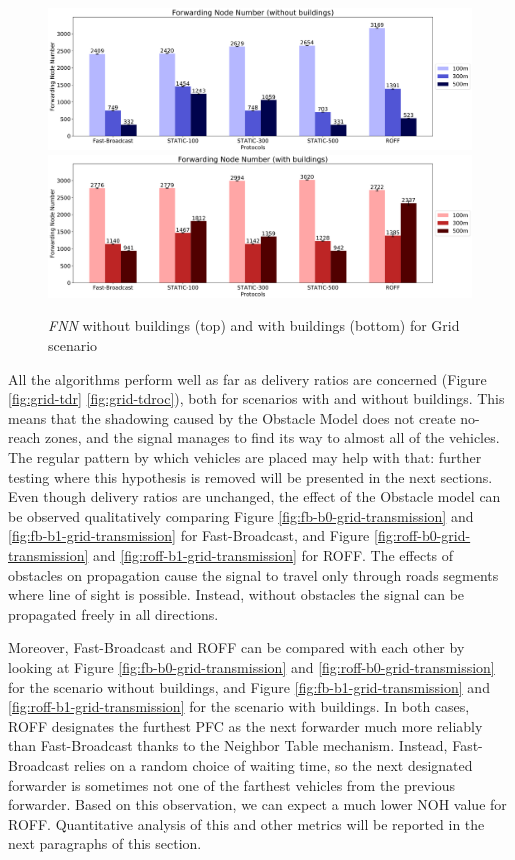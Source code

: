 		\begin{figure}[H]
			\centering
			\includegraphics[width=1.0\textwidth]{immagini/grid-300/b0/fnn}
			\includegraphics[width=1.0\textwidth]{immagini/grid-300/b1/fnn}
			\caption{\textit{FNN} without buildings (top) and with buildings (bottom) for Grid scenario}
			\label{fig:grid-fnn}
		\end{figure}
	
		All the algorithms perform well as far as delivery ratios are concerned (Figure \ref{fig:grid-tdr} \ref{fig:grid-tdroc}), both for scenarios with and without buildings. This means that the shadowing caused by the Obstacle Model does not create no-reach zones, and the signal manages to find its way to almost all of the vehicles. The regular pattern by which vehicles are placed may help with that: further testing where this hypothesis is removed will be presented in the next sections. Even though delivery ratios are unchanged, the effect of the Obstacle model can be observed qualitatively comparing Figure \ref{fig:fb-b0-grid-transmission} and \ref{fig:fb-b1-grid-transmission} for Fast-Broadcast, and Figure \ref{fig:roff-b0-grid-transmission} and \ref{fig:roff-b1-grid-transmission} for ROFF. The effects of obstacles on propagation cause the signal to travel only through roads segments where line of sight is possible. Instead, without obstacles the signal can be propagated freely in all directions.
		
		
		Moreover, Fast-Broadcast and ROFF can be compared with each other by looking at Figure \ref{fig:fb-b0-grid-transmission} and \ref{fig:roff-b0-grid-transmission} for the scenario without buildings, and Figure \ref{fig:fb-b1-grid-transmission} and \ref{fig:roff-b1-grid-transmission} for the scenario with buildings. In both cases, ROFF designates the furthest PFC as the next forwarder much more reliably than Fast-Broadcast thanks to the Neighbor Table mechanism. Instead, Fast-Broadcast relies on a random choice of waiting time, so the next designated forwarder is sometimes not one of the farthest vehicles from the previous forwarder. Based on this observation, we can expect a much lower NOH value for ROFF. Quantitative analysis of this and other metrics will be reported in the next paragraphs of this section.
		

